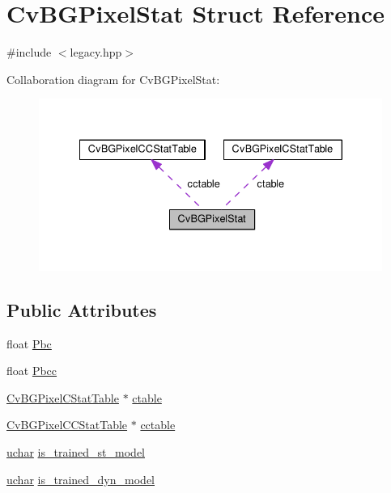 \hypertarget{structCvBGPixelStat}{\section{Cv\-B\-G\-Pixel\-Stat Struct Reference}
\label{structCvBGPixelStat}
}


{\ttfamily \#include $<$legacy.\-hpp$>$}



Collaboration diagram for Cv\-B\-G\-Pixel\-Stat\-:\nopagebreak
\begin{figure}[H]
\begin{center}
\leavevmode
\includegraphics[width=335pt]{structCvBGPixelStat__coll__graph}
\end{center}
\end{figure}
\subsection*{Public Attributes}
\begin{DoxyCompactItemize}
\item 
float \hyperlink{structCvBGPixelStat_acfe036c8c4bb456ae384f43ebddd1629}{Pbc}
\item 
float \hyperlink{structCvBGPixelStat_a7d5b13421a935222967e1a30d14ea4f7}{Pbcc}
\item 
\hyperlink{structCvBGPixelCStatTable}{Cv\-B\-G\-Pixel\-C\-Stat\-Table} $\ast$ \hyperlink{structCvBGPixelStat_a856e3ea97f987f7888f3d0c6daa17614}{ctable}
\item 
\hyperlink{structCvBGPixelCCStatTable}{Cv\-B\-G\-Pixel\-C\-C\-Stat\-Table} $\ast$ \hyperlink{structCvBGPixelStat_a6e516d9913cc4cf3764abeeffe8cf35d}{cctable}
\item 
\hyperlink{core_2types__c_8h_a65f85814a8290f9797005d3b28e7e5fc}{uchar} \hyperlink{structCvBGPixelStat_a1bf6fcf273879a8934e6f9aef4494331}{is\-\_\-trained\-\_\-st\-\_\-model}
\item 
\hyperlink{core_2types__c_8h_a65f85814a8290f9797005d3b28e7e5fc}{uchar} \hyperlink{structCvBGPixelStat_aad3efd5bcefd90b3fc0cd9c1e39095d4}{is\-\_\-trained\-\_\-dyn\-\_\-model}
\end{DoxyCompactItemize}


